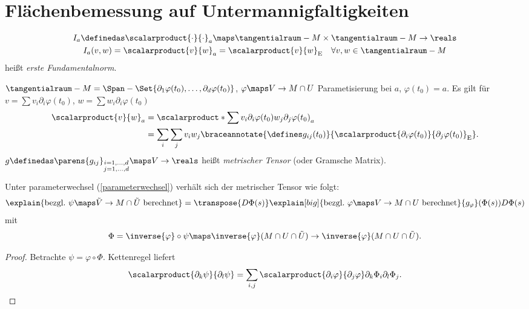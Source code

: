 \section*{Flächenbemessung auf Untermannigfaltigkeiten}
\begin{definition*}
  \begin{gather*}
    I_a\definedas \scalarproduct{\cdot}{\cdot}_a\maps \tangentialraum-{M}\times\tangentialraum-{M}\to \reals\\
    I_a(v,w)=\scalarproduct{v}{w}_{a}=\scalarproduct{v}{w}_{\text{E}}\quad \forall v,w\in \tangentialraum-{M}
  \end{gather*}
  heißt \emph{erste Fundamentalnorm}.
\end{definition*}
\begin{bemerkung*}
  \( \tangentialraum-{M}=\Span-{\Set{\partial_1 \varphi(t_0),\dotsc,\partial_d \varphi(t_0)}} \), \( \varphi\maps V\to M\cap U \) Parametisierung bei \( a \), \( \varphi(t_0)=a \). Es gilt für \( v=\sum v_i \partial_i \varphi(t_0) \), \( w=\sum w_i \partial_i \varphi(t_0) \)
  \begin{align*}
    \scalarproduct{v}{w}_{a}&=\scalarproduct*{\sum v_i \partial_i \varphi(t_0)}{w_j \partial_j \varphi(t_0)}_{a}\\
    &=\sum_{i}\sum_j v_i w_j \braceannotate{\defines g_{ij}(t_0)}{\scalarproduct{\partial_i \varphi(t_0)}{\partial_j \varphi(t_0)}_{\text{E}}}.
  \end{align*}
  \( g\definedas \parens{g_{ij}}_{\substack{i=1,\dotsc,d\\ j=1,\dotsc,d}}\maps V\to \reals \) heißt \emph{metrischer Tensor} (oder Gramsche Matrix).
\end{bemerkung*}
\begin{lemma}
   Unter parameterwechsel (\vgl \ref{parameterwechsel}) verhält sich der metrischer Tensor wie folgt:
   \begin{equation*}
     \explain{\text{bezgl.\ \( \psi\maps \tilde{V}\to M\cap \tilde{U} \) berechnet}}=\transpose{D\Phi(s)}\explain[big]{\text{bezgl.\ \( \varphi\maps V\to M\cap U \) berechnet}}{g_{\varphi}}(\Phi(s))D\Phi(s)
   \end{equation*}
   mit
   \begin{equation*}
    \Phi=\inverse{\varphi}\circ \psi\maps  \inverse{\varphi}(M\cap U\cap \tilde{U})\to \inverse{\varphi}(M\cap U\cap \tilde{U}).
   \end{equation*}
\end{lemma}
\begin{proof}
  Betrachte \( \psi=\varphi\circ \Phi \). Kettenregel liefert
  \begin{equation*}
    \scalarproduct{\partial_k \psi}{\partial_l \psi}=\sum_{i,j}\scalarproduct{\partial_i \varphi}{\partial_j \varphi}\partial_k \Phi_i\partial_l \Phi_j.
  \end{equation*}
\end{proof}
